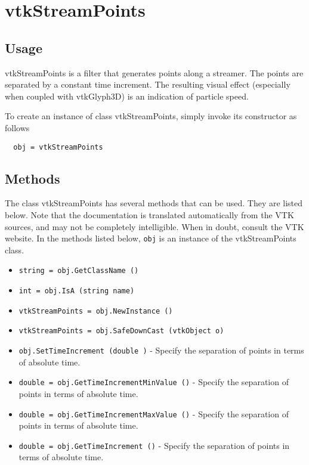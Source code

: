 \section{vtkStreamPoints}

\subsection{Usage}

 vtkStreamPoints is a filter that generates points along a streamer.
 The points are separated by a constant time increment. The resulting visual
 effect (especially when coupled with vtkGlyph3D) is an indication of 
 particle speed.

To create an instance of class vtkStreamPoints, simply
invoke its constructor as follows
\begin{verbatim}
  obj = vtkStreamPoints
\end{verbatim}
\subsection{Methods}

The class vtkStreamPoints has several methods that can be used.
  They are listed below.
Note that the documentation is translated automatically from the VTK sources,
and may not be completely intelligible.  When in doubt, consult the VTK website.
In the methods listed below, \verb|obj| is an instance of the vtkStreamPoints class.
\begin{itemize}
\item  \verb|string = obj.GetClassName ()|

\item  \verb|int = obj.IsA (string name)|

\item  \verb|vtkStreamPoints = obj.NewInstance ()|

\item  \verb|vtkStreamPoints = obj.SafeDownCast (vtkObject o)|

\item  \verb|obj.SetTimeIncrement (double )| -  Specify the separation of points in terms of absolute time.

\item  \verb|double = obj.GetTimeIncrementMinValue ()| -  Specify the separation of points in terms of absolute time.

\item  \verb|double = obj.GetTimeIncrementMaxValue ()| -  Specify the separation of points in terms of absolute time.

\item  \verb|double = obj.GetTimeIncrement ()| -  Specify the separation of points in terms of absolute time.

\end{itemize}

